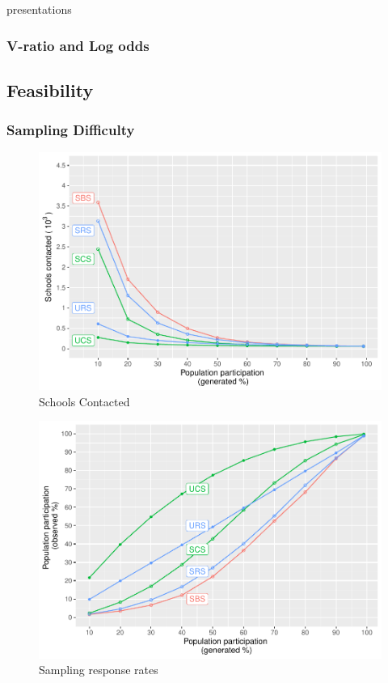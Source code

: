 \documentclass[
  english,
  man,floatsintext]{apa6}
\begin{document}
presentations

\hypertarget{v-ratio-and-log-odds}{%
\subsubsection{V-ratio and Log odds}\label{v-ratio-and-log-odds}}

\hypertarget{feasibility}{%
\subsection{Feasibility}\label{feasibility}}

\hypertarget{sampling-difficulty}{%
\subsubsection{Sampling Difficulty}\label{sampling-difficulty}}

\begin{figure}
\centering
\includegraphics{5---Analysis_files/figure-latex/unnamed-chunk-29-1.pdf}
\caption{\label{fig:unnamed-chunk-29}Schools Contacted}
\end{figure}

\begin{figure}
\centering
\includegraphics{5---Analysis_files/figure-latex/unnamed-chunk-30-1.pdf}
\caption{\label{fig:unnamed-chunk-30}Sampling response rates}
\end{figure}
\end{document}
